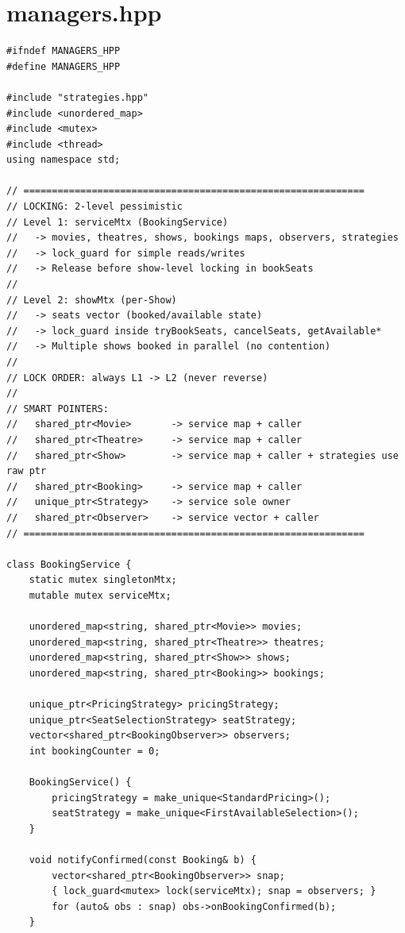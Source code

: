 \documentclass[11pt,a4paper]{article}
\begin{document}
\newpage
\section{managers.hpp}
\begin{lstlisting}[title={\texttt{managers.hpp}}]
#ifndef MANAGERS_HPP
#define MANAGERS_HPP

#include "strategies.hpp"
#include <unordered_map>
#include <mutex>
#include <thread>
using namespace std;

// ============================================================
// LOCKING: 2-level pessimistic
// Level 1: serviceMtx (BookingService)
//   -> movies, theatres, shows, bookings maps, observers, strategies
//   -> lock_guard for simple reads/writes
//   -> Release before show-level locking in bookSeats
//
// Level 2: showMtx (per-Show)
//   -> seats vector (booked/available state)
//   -> lock_guard inside tryBookSeats, cancelSeats, getAvailable*
//   -> Multiple shows booked in parallel (no contention)
//
// LOCK ORDER: always L1 -> L2 (never reverse)
//
// SMART POINTERS:
//   shared_ptr<Movie>       -> service map + caller
//   shared_ptr<Theatre>     -> service map + caller
//   shared_ptr<Show>        -> service map + caller + strategies use raw ptr
//   shared_ptr<Booking>     -> service map + caller
//   unique_ptr<Strategy>    -> service sole owner
//   shared_ptr<Observer>    -> service vector + caller
// ============================================================

class BookingService {
    static mutex singletonMtx;
    mutable mutex serviceMtx;

    unordered_map<string, shared_ptr<Movie>> movies;
    unordered_map<string, shared_ptr<Theatre>> theatres;
    unordered_map<string, shared_ptr<Show>> shows;
    unordered_map<string, shared_ptr<Booking>> bookings;

    unique_ptr<PricingStrategy> pricingStrategy;
    unique_ptr<SeatSelectionStrategy> seatStrategy;
    vector<shared_ptr<BookingObserver>> observers;
    int bookingCounter = 0;

    BookingService() {
        pricingStrategy = make_unique<StandardPricing>();
        seatStrategy = make_unique<FirstAvailableSelection>();
    }

    void notifyConfirmed(const Booking& b) {
        vector<shared_ptr<BookingObserver>> snap;
        { lock_guard<mutex> lock(serviceMtx); snap = observers; }
        for (auto& obs : snap) obs->onBookingConfirmed(b);
    }


\end{lstlisting}
\end{document}
